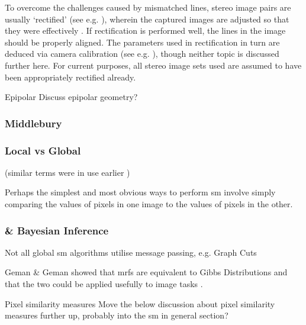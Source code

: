 To overcome the challenges caused by mismatched lines, stereo image pairs are usually `rectified' (see e.g. \cite[Ch. 1.5.1]{Wohler2013}), wherein the captured images are adjusted so that they were effectively .  If rectification is performed well, the lines in the image should be properly aligned.  The parameters used in rectification in turn are deduced via camera calibration (see e.g. \cite[Ch. 1.4]{Wohler2013}), though neither topic is discussed further here.  For current purposes, all stereo image sets used are assumed to have been appropriately rectified already.

\begin{anfxnote}{Epipolar}
    Discuss epipolar geometry?
\end{anfxnote}

\subsubsection{Middlebury}

\subsubsection{Local vs Global}
\cite{Scharstein2002}  (similar terms were in use earlier \cite{Gimelfarb1998})

Perhaps the simplest and most obvious ways to perform \gls{sm} involve simply comparing the values of pixels in one image to the values of pixels in the other.

\subsubsection{ \& Bayesian Inference}
\cite{Kolmogorov2015,Blake2011}

Not all global \gls{sm} algorithms utilise message passing, e.g. Graph Cuts \cite{Kolmogorov2001,Tappen2003}

Geman \& Geman \cite{Geman1984} showed that \glspl{mrf} are equivalent to Gibbs Distributions and that the two could be applied usefully to image tasks \cite{Gimelfarb1999}.

\begin{anfxwarning}{Pixel similarity measures}
    Move the below discussion about pixel similarity measures further up, probably into the \gls{sm} in general section?
\end{anfxwarning}

